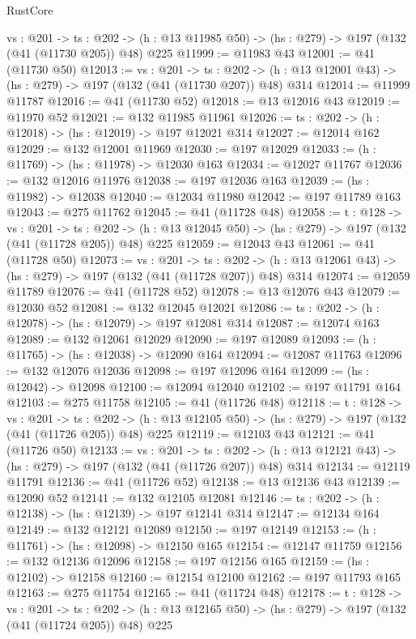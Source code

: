 \begin{lexlean}{RustCore}
\begin{coremodule}
  {vs : @201} ->
  {ts : @202} -> (h : @13 @11985 @50) -> (hs : @279) -> @197 (@132 (@41 (@11730 @205)) @48) @225
@11999 := @11983 @43
@12001 := @41 (@11730 @50)
@12013 := {vs : @201} ->
  {ts : @202} -> (h : @13 @12001 @43) -> (hs : @279) -> @197 (@132 (@41 (@11730 @207)) @48) @314
@12014 := @11999 @11787
@12016 := @41 (@11730 @52)
@12018 := @13 @12016 @43
@12019 := @11970 @52
@12021 := @132 @11985 @11961
@12026 := {ts : @202} -> (h : @12018) -> (hs : @12019) -> @197 @12021 @314
@12027 := @12014 @162
@12029 := @132 @12001 @11969
@12030 := @197 @12029
@12033 := (h : @11769) -> (hs : @11978) -> @12030 @163
@12034 := @12027 @11767
@12036 := @132 @12016 @11976
@12038 := @197 @12036 @163
@12039 := (hs : @11982) -> @12038
@12040 := @12034 @11980
@12042 := @197 @11789 @163
@12043 := @275 @11762
@12045 := @41 (@11728 @48)
@12058 := {t : @128} ->
  {vs : @201} ->
  {ts : @202} -> (h : @13 @12045 @50) -> (hs : @279) -> @197 (@132 (@41 (@11728 @205)) @48) @225
@12059 := @12043 @43
@12061 := @41 (@11728 @50)
@12073 := {vs : @201} ->
  {ts : @202} -> (h : @13 @12061 @43) -> (hs : @279) -> @197 (@132 (@41 (@11728 @207)) @48) @314
@12074 := @12059 @11789
@12076 := @41 (@11728 @52)
@12078 := @13 @12076 @43
@12079 := @12030 @52
@12081 := @132 @12045 @12021
@12086 := {ts : @202} -> (h : @12078) -> (hs : @12079) -> @197 @12081 @314
@12087 := @12074 @163
@12089 := @132 @12061 @12029
@12090 := @197 @12089
@12093 := (h : @11765) -> (hs : @12038) -> @12090 @164
@12094 := @12087 @11763
@12096 := @132 @12076 @12036
@12098 := @197 @12096 @164
@12099 := (hs : @12042) -> @12098
@12100 := @12094 @12040
@12102 := @197 @11791 @164
@12103 := @275 @11758
@12105 := @41 (@11726 @48)
@12118 := {t : @128} ->
  {vs : @201} ->
  {ts : @202} -> (h : @13 @12105 @50) -> (hs : @279) -> @197 (@132 (@41 (@11726 @205)) @48) @225
@12119 := @12103 @43
@12121 := @41 (@11726 @50)
@12133 := {vs : @201} ->
  {ts : @202} -> (h : @13 @12121 @43) -> (hs : @279) -> @197 (@132 (@41 (@11726 @207)) @48) @314
@12134 := @12119 @11791
@12136 := @41 (@11726 @52)
@12138 := @13 @12136 @43
@12139 := @12090 @52
@12141 := @132 @12105 @12081
@12146 := {ts : @202} -> (h : @12138) -> (hs : @12139) -> @197 @12141 @314
@12147 := @12134 @164
@12149 := @132 @12121 @12089
@12150 := @197 @12149
@12153 := (h : @11761) -> (hs : @12098) -> @12150 @165
@12154 := @12147 @11759
@12156 := @132 @12136 @12096
@12158 := @197 @12156 @165
@12159 := (hs : @12102) -> @12158
@12160 := @12154 @12100
@12162 := @197 @11793 @165
@12163 := @275 @11754
@12165 := @41 (@11724 @48)
@12178 := {t : @128} ->
  {vs : @201} ->
  {ts : @202} -> (h : @13 @12165 @50) -> (hs : @279) -> @197 (@132 (@41 (@11724 @205)) @48) @225

\end{coremodule}
\end{lexlean}

